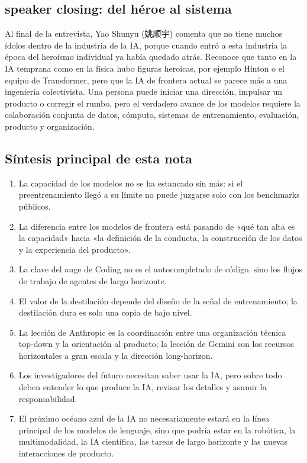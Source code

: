\documentclass[a4paper]{article}
\begin{document}
\subsection{ speaker closing: del héroe al sistema}

Al final de la entrevista, Yao Shunyu (姚顺宇) comenta que no tiene muchos ídolos dentro de la industria de la IA, porque cuando entró a esta industria la época del heroísmo individual ya había quedado atrás. Reconoce que tanto en la IA temprana como en la física hubo figuras heroicas, por ejemplo Hinton o el equipo de Transformer, pero que la IA de frontera actual se parece más a una ingeniería colectivista. Una persona puede iniciar una dirección, impulsar un producto o corregir el rumbo, pero el verdadero avance de los modelos requiere la colaboración conjunta de datos, cómputo, sistemas de entrenamiento, evaluación, producto y organización.

\subsection{Síntesis principal de esta nota}

\begin{enumerate}
\item La capacidad de los modelos no se ha estancado sin más: si el preentrenamiento llegó a su límite no puede juzgarse solo con los benchmarks públicos.
\item La diferencia entre los modelos de frontera está pasando de «qué tan alta es la capacidad» hacia «la definición de la conducta, la construcción de los datos y la experiencia del producto».
\item La clave del auge de Coding no es el autocompletado de código, sino los flujos de trabajo de agentes de largo horizonte.
\item El valor de la destilación depende del diseño de la señal de entrenamiento; la destilación dura es solo una copia de bajo nivel.
\item La lección de Anthropic es la coordinación entre una organización técnica top-down y la orientación al producto; la lección de Gemini son los recursos horizontales a gran escala y la dirección long-horizon.
\item Los investigadores del futuro necesitan saber usar la IA, pero sobre todo deben entender lo que produce la IA, revisar los detalles y asumir la responsabilidad.
\item El próximo océano azul de la IA no necesariamente estará en la línea principal de los modelos de lenguaje, sino que podría estar en la robótica, la multimodalidad, la IA científica, las tareas de largo horizonte y las nuevas interacciones de producto.
\end{enumerate}
\end{document}
